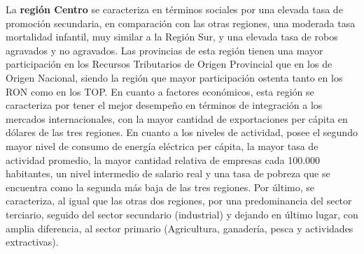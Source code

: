 \documentclass[12pt,a4paper]{article}
\begin{document}
La \textbf{región Centro} se caracteriza en términos sociales por una elevada tasa de promoción secundaria, en comparación con las otras regiones, una moderada tasa mortalidad infantil, muy similar a la Región Sur, y una elevada tasa de robos agravados y no agravados. Las provincias de esta región tienen una mayor participación en los Recursos Tributarios de Origen Provincial que en los de Origen Nacional, siendo la región que mayor participación ostenta tanto en los RON como en los TOP. En cuanto a factores económicos, esta región se caracteriza por tener el mejor desempeño en términos de integración a los mercados internacionales, con la mayor cantidad de exportaciones per cápita en dólares de las tres regiones. En cuanto a los niveles de actividad, posee el segundo mayor nivel de consumo  de energía eléctrica per cápita, la mayor tasa de actividad promedio, la mayor cantidad relativa de empresas cada 100.000 habitantes, un nivel intermedio de salario real  y una tasa de pobreza que se encuentra como la segunda más baja de las tres regiones. Por último, se caracteriza, al igual que las otras dos regiones, por una predominancia del sector terciario, seguido del sector secundario (industrial) y dejando en último lugar, con amplia diferencia, al sector primario (Agricultura, ganadería, pesca y actividades extractivas).
\end{document}
